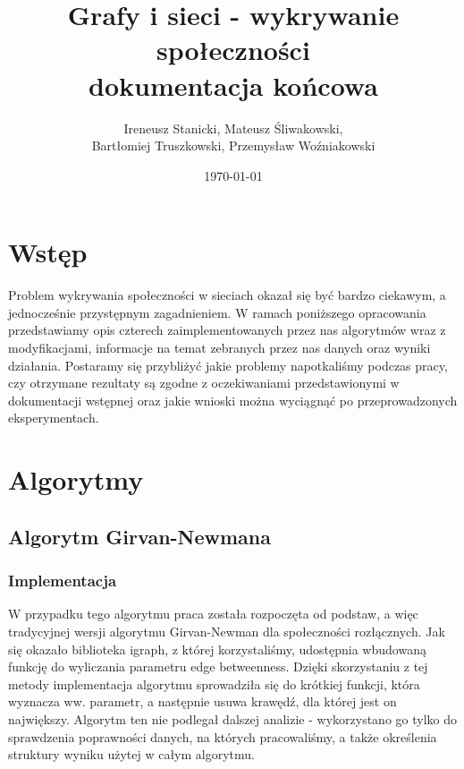 \documentclass{article}
\title{Grafy i sieci - wykrywanie społeczności\\dokumentacja końcowa}
\date{\today}
\author{Ireneusz Stanicki, Mateusz Śliwakowski,\\Bartłomiej Truszkowski, Przemysław Woźniakowski}
\begin{document}
	\begin{titlingpage}
		\maketitle
	\end{titlingpage}

\tableofcontents
\newpage

\section{Wstęp}
Problem wykrywania społeczności w sieciach okazał się być bardzo ciekawym, a jednocześnie przystępnym zagadnieniem. W ramach poniższego opracowania przedstawiamy opis czterech zaimplementowanych przez nas algorytmów wraz z modyfikacjami, informacje na temat zebranych przez nas danych oraz wyniki działania. Postaramy się przybliżyć jakie problemy napotkaliśmy podczas pracy, czy otrzymane rezultaty są zgodne z oczekiwaniami przedstawionymi w dokumentacji wstępnej oraz jakie wnioski można wyciągnąć po przeprowadzonych eksperymentach.

\section{Algorytmy}

\subsection{Algorytm Girvan-Newmana}
\subsubsection{Implementacja}

W przypadku tego algorytmu praca została rozpoczęta od podstaw, a więc tradycyjnej wersji algorytmu Girvan-Newman dla społeczności rozłącznych. Jak się okazało biblioteka igraph, z której korzystaliśmy, udostępnia wbudowaną funkcję do wyliczania parametru edge betweenness. Dzięki skorzystaniu z tej metody implementacja algorytmu sprowadziła się do krótkiej funkcji, która wyznacza ww. parametr, a następnie usuwa krawędź, dla której jest on największy. Algorytm ten nie podlegał dalszej analizie - wykorzystano go tylko do sprawdzenia poprawności danych, na których pracowaliśmy, a także określenia struktury wyniku użytej w całym algorytmu.\\
\end{document}
